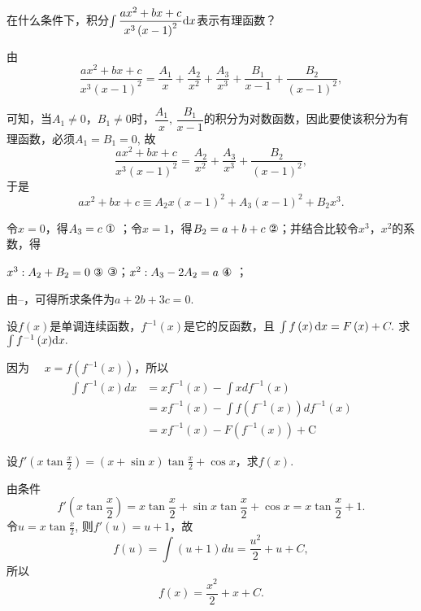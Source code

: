 \begin{problem}
在什么条件下，积分$\int\dfrac{ax^{2} + bx + c}{x^{3}\left( x - 1 \right)^{2}}{\mathop{}\!\mathrm{d} x}$表示有理函数？

\begin{solution}
由$$\frac{ax^{2} + bx + c}{x^{3}\left( x - 1 \right)^{2}} = \frac{A_{1}}{x} + \frac{A_{2}}{x^{2}} + \frac{A_{3}}{x^{3}} + \frac{B_{1}}{x - 1} + \frac{B_{2}}{\left( x - 1 \right)^{2}},$$

可知，当$A_{1} \neq 0$，$B_{1} \neq 0$时，$\dfrac{A_{1}}{x}$, $\dfrac{B_{1}}{x - 1}$的积分为对数函数，因此要使该积分为有理函数，必须$A_{1} = B_{1} = 0$, 故
$$\frac{ax^{2} + bx + c}{x^{3}\left( x - 1 \right)^{2}} = \frac{A_{2}}{x^{2}} + \frac{A_{3}}{x^{3}} + \frac{B_{2}}{\left( x - 1 \right)^{2}},$$
于是
$$ax^{2} + bx + c \equiv A_{2}x\left( x - 1 \right)^{2} + A_{3}\left( x - 1 \right)^{2} + B_{2}x^{3}.$$

令$x = 0$，得$A_{3} = c\ \text{\ding{172}}$ ；令$x = 1$，得$B_{2} = a + b + c\ \text{\ding{173}}$；并结合比较令$x^{3}$，$x^{2}$的系数，得

$x^{3}:A_{2} + B_{2} = 0\ \text{\ding{174}}$ ③；$x^{2}:A_{3} - 2A_{2} = a\ \text{\ding{175}}$ ；

由--，可得所求条件为$a + 2b + 3c = 0.$

\end{solution}   \end{problem}\begin{problem}
设$f\left( x \right)$是单调连续函数，$f^{- 1}\left( x \right)$是它的反函数，且
$\int{f\left( x \right)}\mathop{}\!\mathrm{d} x = F\left( x \right) + C.$ 求$\int {f^{- 1}\left( x \right)}{\mathop{}\!\mathrm{d}x}.$

\begin{solution} 因为 $\quad x = f\left( f^{- 1}\left( x \right) \right)$，所以
$$\begin{aligned} \int f^{-1}(x) d x &=x f^{-1}(x)-\int x d f^{-1}(x) \\ &=x f^{-1}(x)-\int f\left(f^{-1}(x)\right) d f^{-1}(x) \\ &=x f^{-1}(x)-F\left(f^{-1}(x)\right)+\mathrm{C} \end{aligned}$$

\end{solution}   \end{problem}

\begin{problem}
设$\displaystyle f'\left( x\tan\frac{x}{2} \right) = \left( x + \sin x \right)\tan\frac{x}{2} + \cos x$，求$f\left( x \right)$.

\begin{solution}
	由条件
$$f'\left( x\tan\frac{x}{2} \right) = x\tan\frac{x}{2} + \sin x\tan\frac{x}{2} + \cos x = x\tan\frac{x}{2} + 1.$$
令$\displaystyle u = x\tan \frac{x}{2}$, 则$f'\left( u \right) = u + 1$，故
$$f\left( u \right) = \int \left( u + 1 \right)du = \frac{u^{2}}{2} + u + C,$$
所以
$$ f\left( x \right) = \frac{x^{2}}{2} + x + C.$$
\end{solution}   \end{problem}



